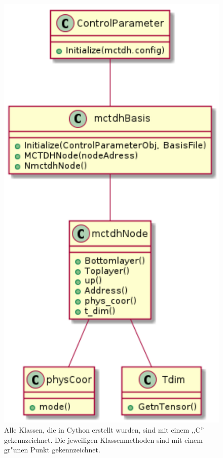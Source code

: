 \begin{figure}
    \centering
    \includegraphics[scale=0.6]{figures/sequenceDiagram}
    \caption{Alle Klassen, die in Cython erstellt wurden, sind mit einem ,,C'' gekennzeichnet. Die jeweiligen Klassenmethoden sind mit einem
    gr"unen Punkt gekennzeichnet.}\label{fig:uml_Cython}
\end{figure}

